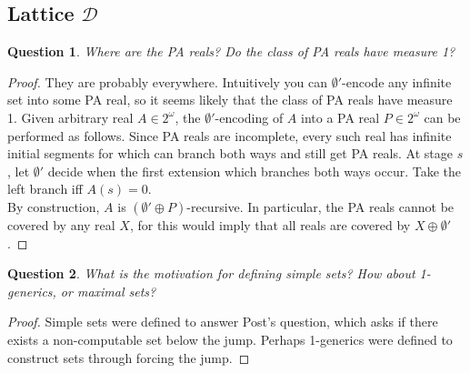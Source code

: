\documentclass{article}
\newtheorem{question}{Question}[subsection]
\begin{document}
  \subsection{Lattice $\mathcal{D}$}
    \begin{question}
      Where are the PA reals? Do the class of PA reals have measure 1?
    \end{question}
    \begin{proof}
      They are probably everywhere. Intuitively you can $\emptyset'$-encode
      any infinite set into some PA real, so it seems likely that the class
      of PA reals have measure 1. Given arbitrary real $A\in2^\omega$, the
      $\emptyset'$-encoding of $A$ into a PA real $P\in2^\omega$ can be
      performed as follows. Since PA reals are incomplete, every such real
      has infinite initial segments for which can branch both ways and
      still get PA reals. At stage $s$, let $\emptyset'$ decide when the
      first extension which branches both ways occur. Take the left branch
      iff $A(s)=0$. \\

      By construction, $A$ is $(\emptyset'\oplus P)$-recursive. In
      particular, the PA reals cannot be covered by any real $X$, for this
      would imply that all reals are covered by $X\oplus\emptyset'$.
    \end{proof}

    \begin{question}
      What is the motivation for defining simple sets? How about
      1-generics, or maximal sets?
    \end{question}
    \begin{proof}
      Simple sets were defined to answer Post's question, which asks if
      there exists a non-computable set below the jump. Perhaps 1-generics
      were defined to construct sets through forcing the jump.
    \end{proof}
\end{document}
